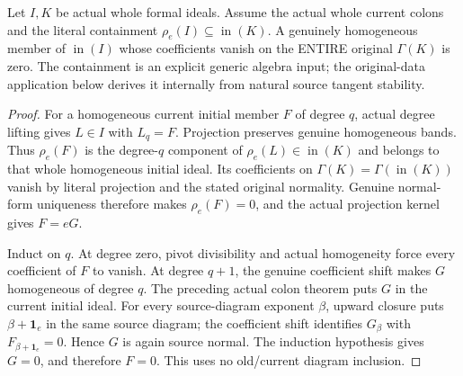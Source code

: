 \begin{theorem}
\label{hir:actual-current-initial-source-normal-independence}
\leanok
Let $I,K$ be actual whole formal ideals. Assume the actual whole
current colons and the literal containment
$\rho_e(I)\subseteq\operatorname{in}(K)$. A genuinely homogeneous
member of $\operatorname{in}(I)$ whose coefficients vanish on the
ENTIRE original $\Gamma(K)$ is zero. The containment is an explicit
generic algebra input; the original-data application below derives it
internally from natural source tangent stability.
\end{theorem}
\begin{proof}
For a homogeneous current initial member $F$ of degree $q$, actual
degree lifting gives $L\in I$ with $L_q=F$. Projection preserves
genuine homogeneous bands. Thus $\rho_e(F)$ is the degree-$q$
component of $\rho_e(L)\in\operatorname{in}(K)$ and belongs to
that whole homogeneous initial ideal. Its coefficients on
$\Gamma(K)=\Gamma(\operatorname{in}(K))$ vanish by literal projection
and the stated original normality. Genuine normal-form uniqueness
therefore makes $\rho_e(F)=0$, and the actual projection kernel gives
$F=eG$.

Induct on $q$. At degree zero, pivot divisibility and actual homogeneity
force every coefficient of $F$ to vanish. At degree $q+1$, the genuine
coefficient shift makes $G$ homogeneous of degree $q$. The preceding
actual colon theorem puts $G$ in the current initial ideal. For every
source-diagram exponent $\beta$, upward closure puts
$\beta+\mathbf1_e$ in the same source diagram; the coefficient shift
identifies $G_\beta$ with $F_{\beta+\mathbf1_e}=0$. Hence $G$ is
again source normal. The induction hypothesis gives $G=0$, and
therefore $F=0$. This uses no old/current diagram inclusion.
\end{proof}

